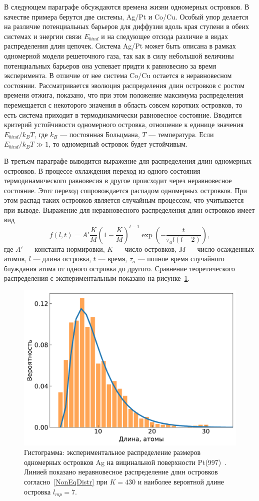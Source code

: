 \documentclass[10pt]{book}
\begin{document}
В следующем параграфе обсуждаются времена жизни одномерных островков. В качестве примера берутся две системы, Ag/Pt и Co/Cu. Особый упор делается на различие потенциальных барьеров для диффузии вдоль края ступени в обеих системах и энергии связи $E_{bind}$ и на следующее отсюда различие в видах распределения длин цепочек. Система Ag/Pt может быть описана в рамках одномерной модели решеточного газа, так как в силу небольшой величины потенциальных барьеров она успевает придти к равновесию за время эксперимента. В отличие от нее система Co/Cu остается в неравновесном состоянии. Рассматривается эволюция распределения длин островков с ростом времени отжига, показано, что при этом положение максимума распределения перемещается с некоторого значения в область совсем коротких островков, то есть система приходит в термодинамически равновесное состояние.
Вводится критерий устойчивости одномерного островка, отношение к единице значения $E_{bind}/k_B T$, где $k_B$ --- постоянная Больцмана, $T$ --- температура. Если $E_{bind}/k_B T \gg 1$, то одномерный островок будет устойчивым.

В третьем параграфе выводится выражение для распределения длин одномерных островков. В процессе охлаждения переход из одного состояния
термодинамического равновесия в другое происходит через неравновесное состояние. Этот переход сопровождается распадом одномерных островков. При этом распад таких островков является случайным процессом, что учитывается при выводе.
Выражение для неравновесного распределения длин островков имеет вид
\begin{equation}
f(l,t) = A' \frac{K}{M} \left( 1 - \frac{K}{M} \right)^{l-1}  \exp\left(-\frac{t}{ \tau_a l(l-2)}\right),
\label{NonEqDistr}
\end{equation}
где $A'$ --- константа нормировки, $K$ --- число островков, $M$ --- число осажденных атомов, $l$ --- длина островка, $t$ --- время, $\tau_a$ --- полное время случайного блуждания атома от одного островка до другого. Сравнение теоретического распределения с экспериментальным показано на рисунке~\ref{fig:ExpVsTheor}.

\begin{figure}
	\centering
	\includegraphics[width=0.65\linewidth]{fig/eqnoneq/fig4-ExpVsTheor.pdf}
	\caption{Гистограмма: экспериментальное распределение размеров одномерных островков Ag на вицинальной поверхности Pt(997)~\cite{PhysRevB.73.245425}. Линией показано неравновесное распределение длин островков согласно~\eqref{NonEqDistr} при $K=430$ и наиболее вероятной длине островка $l_{mp}=7$.}
	\label{fig:ExpVsTheor}
\end{figure}
\end{document}
